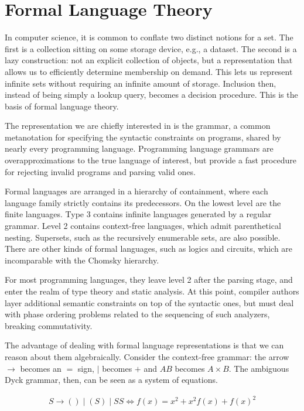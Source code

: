 \chapter{\rm\bfseries Formal Language Theory}
\label{ch:chapter01}

In computer science, it is common to conflate two distinct notions for a set. The first is a collection sitting on some storage device, e.g., a dataset. The second is a lazy construction: not an explicit collection of objects, but a representation that allows us to efficiently determine membership on demand. This lets us represent infinite sets without requiring an infinite amount of storage. Inclusion then, instead of being simply a lookup query, becomes a decision procedure. This is the basis of formal language theory.

The representation we are chiefly interested in is the grammar, a common metanotation for specifying the syntactic constraints on programs, shared by nearly every programming language. Programming language grammars are overapproximations to the true language of interest, but provide a fast procedure for rejecting invalid programs and parsing valid ones.

Formal languages are arranged in a hierarchy of containment, where each language family strictly contains its predecessors. On the lowest level are the finite languages. Type 3 contains infinite languages generated by a regular grammar. Level 2 contains context-free languages, which admit parenthetical nesting. Supersets, such as the recursively enumerable sets, are also possible. There are other kinds of formal languages, such as logics and circuits, which are incomparable with the Chomsky hierarchy.

For most programming languages, they leave level 2 after the parsing stage, and enter the realm of type theory and static analysis. At this point, compiler authors layer additional semantic constraints on top of the syntactic ones, but must deal with phase ordering problems related to the sequencing of such analyzers, breaking commutativity.

The advantage of dealing with formal language representations is that we can reason about them algebraically. Consider the context-free grammar: the arrow $\rightarrow$ becomes an $=$ sign, $\mid$ becomes $+$ and $AB$ becomes $A \times B$. The ambiguous Dyck grammar, then, can be seen as a system of equations.

\begin{align*}
    S \rightarrow ( ) \mid ( S ) \mid S S \Longleftrightarrow f(x) = x^2 + x^2 f(x) + f(x)^2
\end{align*}

